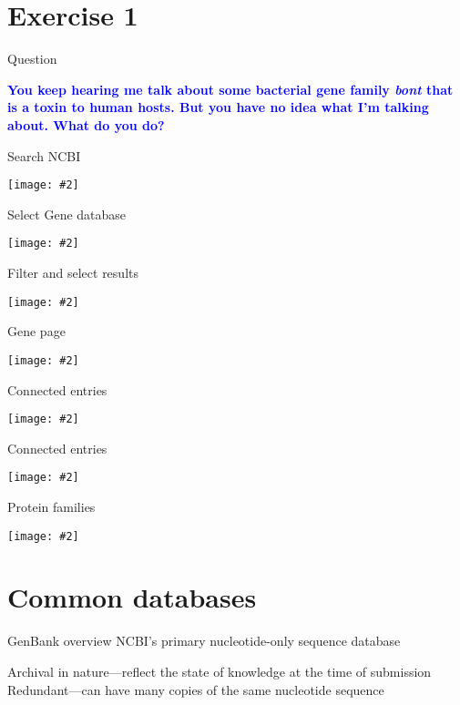 \documentclass{beamer}
\renewcommand{\c}[1]{\begin{center}#1\end{center}}
\newcommand{\blu}[1]{\textcolor{blue}{\textbf{#1}}}
\newcommand{\gr}[2][.95]{\c{\texttt{[image: \#2]}}}
\begin{document}
\section{Exercise 1}

\begin{frame}{Question}
\c{
    \Large \blu{You keep hearing me talk about some bacterial gene family \textit{bont} that is a toxin to human hosts. But you have no idea what I'm talking about. What do you do?}
}
\end{frame}

\begin{frame}{Search NCBI}
    \gr{l2_figs/s13_bont.png}
\end{frame}

\begin{frame}{Select Gene database}
    \gr{l2_figs/s14_bont.png}
\end{frame}

\begin{frame}{Filter and select results}
    \gr{l2_figs/s15_bont.png}
\end{frame}

\begin{frame}{Gene page}
    \gr{l2_figs/s16_bont.png}
\end{frame}

\begin{frame}{Connected entries}
    \gr{l2_figs/s17_bont1.png}
\end{frame}

\begin{frame}{Connected entries}
    \gr{l2_figs/s17_bont2.png}
\end{frame}

\begin{frame}{Protein families}
    \gr{l2_figs/s18_bont_answer.png}
\end{frame}

\section{Common databases}

\begin{frame}{GenBank overview}
NCBI’s primary nucleotide-only sequence database
\begin{outline}
    \1 Archival in nature---reflect the state of knowledge at the time of submission
    \1 Redundant---can have many copies of the same nucleotide sequence
\end{outline}
\end{frame}
\end{document}
